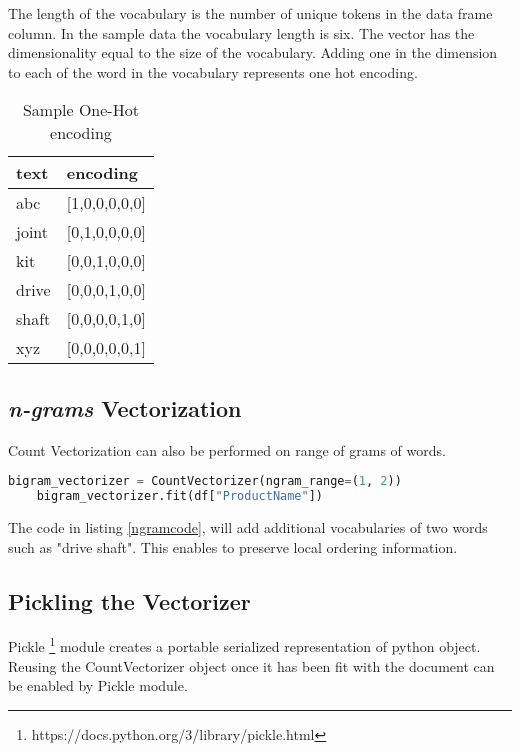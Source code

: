 The length of the vocabulary is the number of unique tokens in the data frame column. In the sample data the vocabulary length is six. The vector has the dimensionality equal to the size of the vocabulary. Adding one in the dimension to each of the word in the vocabulary represents one hot encoding.

\begin{table}[]
    \centering
    \caption{Sample One-Hot encoding}
    \label{table:countencode}
    \begin{tabular}{ ll }
          \toprule
          
          \textbf{text}& \textbf{encoding}\\
          \midrule
          abc&[1,0,0,0,0,0]\\
          joint&[0,1,0,0,0,0]\\
          kit&[0,0,1,0,0,0]\\
          drive&[0,0,0,1,0,0]\\
          shaft&[0,0,0,0,1,0]\\
          xyz&[0,0,0,0,0,1]\\
       
          \bottomrule
          \end{tabular}
\end{table}

\subsection{ \textit{n-grams} Vectorization} \label{sec:ngram_vector}

Count Vectorization can also be performed on range of grams of words. 

\begin{lstlisting}[language=Python,label=ngramcode, caption={\textit{n-gram} vectorization}]
    bigram_vectorizer = CountVectorizer(ngram_range=(1, 2))
    bigram_vectorizer.fit(df["ProductName"])
\end{lstlisting}


The code in listing \ref{ngramcode}, will add additional vocabularies of two words such as "drive shaft". This enables to preserve local ordering information. 

\subsection{Pickling the Vectorizer} \label{pickle_vector}

Pickle \footnote{https://docs.python.org/3/library/pickle.html} module creates a portable serialized representation of python object. Reusing the CountVectorizer object once it has been fit with the document can be enabled by Pickle module. 

